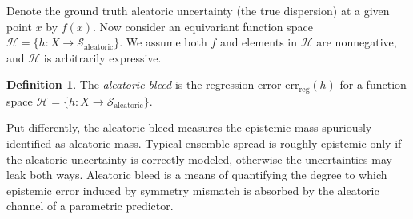 \documentclass[10pt]{article} %
\theoremstyle{definition}
\newtheorem{defn}{Definition}
\begin{document}


Denote the ground truth aleatoric uncertainty (the true dispersion) at a given point $x$ by $f(x)$. Now consider an equivariant function space $\mathscr{H} = \{h: X \to \mathcal{S}_{\text{aleatoric}}\}$. We assume both $f$ and elements in $\mathscr{H}$ are nonnegative, and $\mathscr{H}$ is arbitrarily expressive.

\begin{defn} The \textit{aleatoric bleed} is the regression error $\text{err}_{\text{reg}}(h)$ for a function space $\mathscr{H} = \{h\colon X \to \mathcal{S}_{\text{aleatoric}}\}$.
\end{defn}

Put differently, the aleatoric bleed measures the epistemic mass spuriously identified as aleatoric mass. Typical ensemble spread is roughly epistemic only if the aleatoric uncertainty is correctly modeled, otherwise the uncertainties may leak both ways. Aleatoric bleed is a means of quantifying the degree to which epistemic error induced by symmetry mismatch is absorbed by the aleatoric channel of a parametric predictor. 
\end{document}
